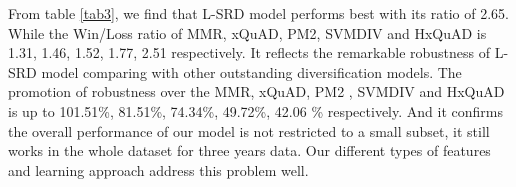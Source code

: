 \documentclass[review]{elsarticle}
\begin{document}

From table \ref{tab3}, we find that L-SRD model performs best with its ratio of 2.65. While the Win/Loss ratio of MMR, xQuAD, PM2, SVMDIV and HxQuAD is 1.31, 1.46, 1.52, 1.77, 2.51 respectively. It reflects the remarkable robustness of L-SRD model comparing with other outstanding diversification models. The promotion of robustness over the MMR, xQuAD, PM2 , SVMDIV and HxQuAD is up to 101.51\%, 81.51\%, 74.34\%, 49.72\%, 42.06 \% respectively. And it confirms the overall performance of our model is not restricted to a small subset, it still works in the whole dataset for three years data. Our different types of features and learning approach address this problem well.


\iffalse
\end{document}
